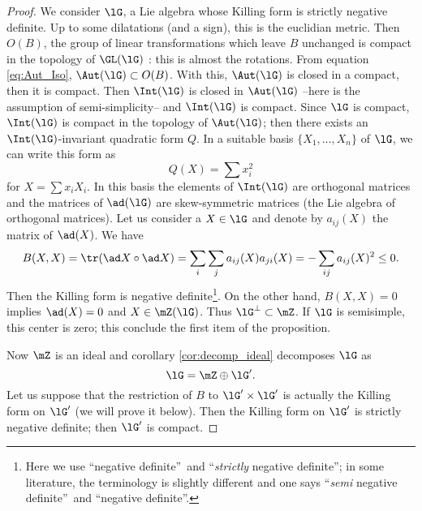\begin{proof}
We consider $\lG$, a Lie algebra whose Killing form is strictly negative definite. Up to some dilatations (and a sign), this is the euclidian metric. Then $O(B)$, the group of linear transformations which leave $B$ unchanged is compact in the topology of $\GL(\lG)$ : this is almost the rotations. From equation \eqref{eq:Aut_Iso}, $\Aut(\lG)\subset O(B)$. With this, $\Aut(\lG)$ is closed in a compact, then it is compact. Then $\Int(\lG)$ is closed in $\Aut(\lG)$ --here is the assumption of semi-simplicity-- and $\Int(\lG)$ is compact.
Since $\lG$ is compact, $\Int(\lG)$ is compact in the topology of $\Aut(\lG)$; then there exists an $\Int(\lG)$-invariant quadratic form $Q$. In a suitable basis $\{X_1,\ldots,X_n\}$ of $\lG$, we can write this form as
\[
   Q(X)=\sum x_i^2
\]
for $X=\sum x_iX_i$. In this basis the elements of $\Int(\lG)$ are orthogonal matrices and the matrices of $\ad(\lG)$ are skew-symmetric matrices (the Lie algebra of orthogonal matrices). Let us consider a $X\in\lG$ and denote by $a_{ij}(X)$ the matrix of $\ad(X)$. We have
\begin{equation}
\begin{split}
  B(X,X)=\tr(\ad X\circ\ad X)
        =\sum_i\sum_ja_{ij}(X)a_{ji}(X)
    =-\sum_{ij}a_{ij}(X)^2\leq 0.
\end{split}
\end{equation}
Then the Killing form is negative definite\footnote{Here we use ``negative definite''\ and ``\emph{strictly} negative definite''; in some literature, the terminology is slightly different and one says ``\emph{semi} negative definite''\ and ``negative definite''.}. On the other hand, $B(X,X)=0$ implies $\ad(X)=0$ and $X\in\mZ(\lG)$. Thus $\lG^{\perp}\subset\mZ$. If $\lG$ is semisimple, this center is zero; this conclude the first item of the proposition.

Now $\mZ$ is an ideal and corollary \ref{cor:decomp_ideal} decomposes $\lG$ as
\begin{equation}
  \lG=\mZ\oplus\lG'.
\end{equation}
Let us suppose that the restriction of $B$ to $\lG'\times\lG'$ is actually the Killing form on $\lG'$ (we will prove it below). Then the Killing form on $\lG'$ is strictly negative definite; then $\lG'$ is compact.


\end{proof}
